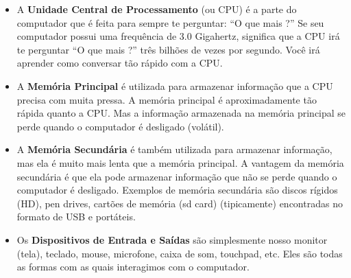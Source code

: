 \begin{itemize}
%

\item A {\bf Unidade Central de Processamento} (ou CPU) é
a parte do computador que é feita para sempre te perguntar:
``O que mais ?'' Se seu computador possui uma frequência de
3.0 Gigahertz, significa que a CPU irá te perguntar ``O que mais ?''
três bilhões de vezes por segundo. Você irá aprender como conversar
tão rápido com a CPU.
%

\item A {\bf Memória Principal} é utilizada para armazenar informação
que a CPU precisa com muita pressa. A memória principal é aproximadamente
tão rápida quanto a CPU. Mas a informação armazenada na memória principal
se perde quando o computador é desligado (volátil).
%

\item A {\bf Memória Secundária} é também utilizada para armazenar
informação, mas ela é muito mais lenta que a memória principal.
A vantagem da memória secundária é que ela pode armazenar informação
que não se perde quando o computador é desligado. Exemplos de memória
secundária são discos rígidos (HD), pen drives, cartões de memória (sd card)
(tipicamente) encontradas no formato de USB e portáteis.
%

\item Os {\bf Dispositivos de Entrada e Saídas} são simplesmente
nosso monitor (tela), teclado, mouse, microfone, caixa de som, touchpad, etc.
Eles são todas as formas com as quais interagimos com o computador.
%


\end{itemize}
